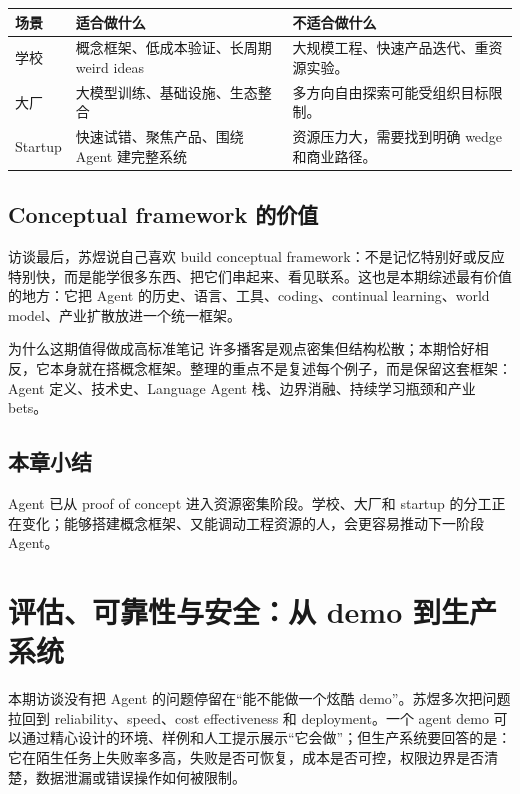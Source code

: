\documentclass[a4paper]{article}
\begin{document}
\noindent\begin{tabularx}{\textwidth}{p{}p{}X}
\toprule
场景 & 适合做什么 & 不适合做什么 \\
\midrule
学校 & 概念框架、低成本验证、长周期 weird ideas & 大规模工程、快速产品迭代、重资源实验。 \\
大厂 & 大模型训练、基础设施、生态整合 & 多方向自由探索可能受组织目标限制。 \\
Startup & 快速试错、聚焦产品、围绕 Agent 建完整系统 & 资源压力大，需要找到明确 wedge 和商业路径。 \\
\bottomrule
\end{tabularx}

\subsection{Conceptual framework 的价值}

访谈最后，苏煜说自己喜欢 build conceptual framework：不是记忆特别好或反应特别快，而是能学很多东西、把它们串起来、看见联系。这也是本期综述最有价值的地方：它把 Agent 的历史、语言、工具、coding、continual learning、world model、产业扩散放进一个统一框架。

\begin{importantbox}{为什么这期值得做成高标准笔记}
许多播客是观点密集但结构松散；本期恰好相反，它本身就在搭概念框架。整理的重点不是复述每个例子，而是保留这套框架：Agent 定义、技术史、Language Agent 栈、边界消融、持续学习瓶颈和产业 bets。
\end{importantbox}

\subsection{本章小结}

Agent 已从 proof of concept 进入资源密集阶段。学校、大厂和 startup 的分工正在变化；能够搭建概念框架、又能调动工程资源的人，会更容易推动下一阶段 Agent。

\section{评估、可靠性与安全：从 demo 到生产系统}

本期访谈没有把 Agent 的问题停留在“能不能做一个炫酷 demo”。苏煜多次把问题拉回到 reliability、speed、cost effectiveness 和 deployment。一个 agent demo 可以通过精心设计的环境、样例和人工提示展示“它会做”；但生产系统要回答的是：它在陌生任务上失败率多高，失败是否可恢复，成本是否可控，权限边界是否清楚，数据泄漏或错误操作如何被限制。
\end{document}
